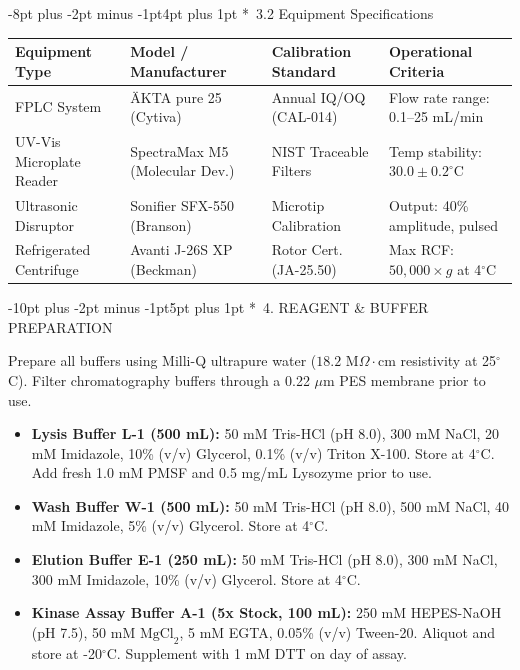 \documentclass[10pt,a4paper]{article}
\makeatletter
\renewcommand\section{\@startsection{section}{1}{\z@}%
  {-10pt plus -2pt minus -1pt}{5pt plus 1pt}%
  {\normalfont\large\bfseries\color{SopNavy}}}
\renewcommand\subsection{\@startsection{subsection}{2}{\z@}%
  {-8pt plus -2pt minus -1pt}{4pt plus 1pt}%
  {\normalfont\small\bfseries\color{SopTeal}}}
\makeatother
\begin{document}
\subsection*{\faCogs\ 3.2 Equipment Specifications}

\begin{table}[h!]
  \centering
  \scriptsize
  \renewcommand{\arraystretch}{1.15}
  \begin{tabularx}{\textwidth}{|p{3.5cm}|Y|p{3.0cm}|Y|}
    \hline
    \color{white}\textbf{Equipment Type} & \color{white}\textbf{Model / Manufacturer} & \color{white}\textbf{Calibration Standard} & \color{white}\textbf{Operational Criteria} \\ \hline
    FPLC System & ÄKTA pure 25 (Cytiva) & Annual IQ/OQ (CAL-014) & Flow rate range: 0.1--25 mL/min \\ \hline
    UV-Vis Microplate Reader & SpectraMax M5 (Molecular Dev.) & NIST Traceable Filters & Temp stability: $30.0 \pm 0.2^\circ$C \\ \hline
    Ultrasonic Disruptor & Sonifier SFX-550 (Branson) & Microtip Calibration & Output: 40\% amplitude, pulsed \\ \hline
    Refrigerated Centrifuge & Avanti J-26S XP (Beckman) & Rotor Cert. (JA-25.50) & Max RCF: $50,000 \times g$ at 4$^\circ$C \\ \hline
  \end{tabularx}
\end{table}

\section*{\faVial\ 4. REAGENT \& BUFFER PREPARATION}

Prepare all buffers using Milli-Q ultrapure water ($18.2\text{ M}\Omega\cdot\text{cm}$ resistivity at 25$^\circ$C). Filter chromatography buffers through a 0.22 $\mu$m PES membrane prior to use.

\begin{itemize}[leftmargin=12pt]
  \item \textbf{Lysis Buffer L-1 (500 mL):} 50 mM Tris-HCl (pH 8.0), 300 mM NaCl, 20 mM Imidazole, 10\% (v/v) Glycerol, 0.1\% (v/v) Triton X-100. Store at 4$^\circ$C. Add fresh 1.0 mM PMSF and 0.5 mg/mL Lysozyme prior to use.
  \item \textbf{Wash Buffer W-1 (500 mL):} 50 mM Tris-HCl (pH 8.0), 500 mM NaCl, 40 mM Imidazole, 5\% (v/v) Glycerol. Store at 4$^\circ$C.
  \item \textbf{Elution Buffer E-1 (250 mL):} 50 mM Tris-HCl (pH 8.0), 300 mM NaCl, 300 mM Imidazole, 10\% (v/v) Glycerol. Store at 4$^\circ$C.
  \item \textbf{Kinase Assay Buffer A-1 (5x Stock, 100 mL):} 250 mM HEPES-NaOH (pH 7.5), 50 mM $\text{MgCl}_2$, 5 mM EGTA, 0.05\% (v/v) Tween-20. Aliquot and store at -20$^\circ$C. Supplement with 1 mM DTT on day of assay.
\end{itemize}
\end{document}
